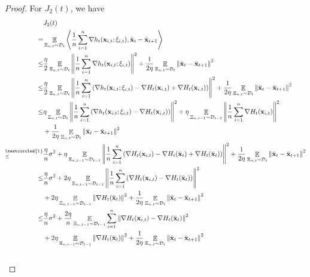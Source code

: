 \documentclass{article}
\begin{document}
\begin{proof}
For $J_2(t)$, we have
\begin{align}
\nonumber
& J_2(t) \\ \nonumber 
= & \EE_{ \Xi_{n,t} \sim \Dcal_{t} }\lrangle{\frac{1}{n}\sum_{i=1}^n\nabla h_t(\x_{i,t};\xi_{i,t}), \bar{\x}_t - \bar{\x}_{t+1} } \\ \nonumber
\le & \frac{\eta}{2}\EE_{ \Xi_{n,t} \sim \Dcal_{t} } \lrnorm{\frac{1}{n}\sum_{i=1}^n \nabla h_t(\x_{i,t};\xi_{i,t})}^2 + \frac{1}{2\eta} \EE_{ \Xi_{n,t} \sim \Dcal_{t} }\lrnorm{ \bar{\x}_t - \bar{\x}_{t+1}}^2  \\ \nonumber
\le & \frac{\eta}{2}\EE_{ \Xi_{n,t} \sim \Dcal_{t} }\lrnorm{\frac{1}{n}\sum_{i=1}^n \lrincir{\nabla  h_t(\x_{i,t};\xi_{i,t}) - \nabla H_t(\x_{i,t}) + \nabla H_t(\x_{i,t})} }^2 + \frac{1}{2\eta} \EE_{ \Xi_{n,t} \sim \Dcal_{t} }\lrnorm{ \bar{\x}_t - \bar{\x}_{t+1}}^2  \\ \nonumber
\le &  \eta\EE_{ \Xi_{n,t} \sim \Dcal_{t} }\lrnorm{\frac{1}{n}\sum_{i=1}^n \lrincir{ \nabla h_t(\x_{i,t};\xi_{i,t}) - \nabla H_t(\x_{i,t}) } }^2 + \eta \EE_{ \Xi_{n,t-1} \sim \Dcal_{t-1} }\lrnorm{\frac{1}{n}\sum_{i=1}^n\nabla H_t(\x_{i,t})}^2 \\ \nonumber 
& + \frac{1}{2\eta} \EE_{ \Xi_{n,t} \sim \Dcal_{t} }\lrnorm{ \bar{\x}_t - \bar{\x}_{t+1}}^2  \\ \nonumber
\refabovecir{\le}{\textcircled{1}} & \frac{\eta}{n} \sigma^2 + \eta \EE_{ \Xi_{n,t-1} \sim \Dcal_{t-1} }\lrnorm{ \frac{1}{n}\sum_{i=1}^n \lrincir{ \nabla H_t(\x_{i,t}) - \nabla H_t(\bar{\x}_t) + \nabla H_t(\bar{\x}_t) } }^2 + \frac{1}{2\eta} \EE_{ \Xi_{n,t} \sim \Dcal_{t} }\lrnorm{ \bar{\x}_t - \bar{\x}_{t+1}}^2 \\ \nonumber
\le & \frac{\eta}{n} \sigma^2 + 2\eta \EE_{ \Xi_{n,t-1} \sim \Dcal_{t-1} }\lrnorm{\frac{1}{n}\sum_{i=1}^n \lrincir{ \nabla H_t(\x_{i,t}) - \nabla H_t(\bar{\x}_t) } }^2 \\ \nonumber 
& + 2\eta \EE_{ \Xi_{n,t-1} \sim \Dcal_{t-1} }\lrnorm{\nabla H_t(\bar{\x}_t)}^2 + \frac{1}{2\eta} \EE_{ \Xi_{n,t} \sim \Dcal_{t} }\lrnorm{ \bar{\x}_t - \bar{\x}_{t+1}}^2 \\ \nonumber
\le & \frac{\eta}{n} \sigma^2 + \frac{2\eta}{n} \EE_{ \Xi_{n,t-1} \sim \Dcal_{t-1} }\sum_{i=1}^n\lrnorm{ \nabla H_t(\x_{i,t}) - \nabla H_t(\bar{\x}_t)  }^2 \\ \nonumber 
& + 2\eta \EE_{ \Xi_{n,t-1} \sim \Dcal_{t-1} }\lrnorm{\nabla H_t(\bar{\x}_t)}^2 + \frac{1}{2\eta} \EE_{ \Xi_{n,t} \sim \Dcal_{t} }\lrnorm{ \bar{\x}_t - \bar{\x}_{t+1}}^2 \\ \nonumber

\end{align}
\end{proof}
\end{document}
